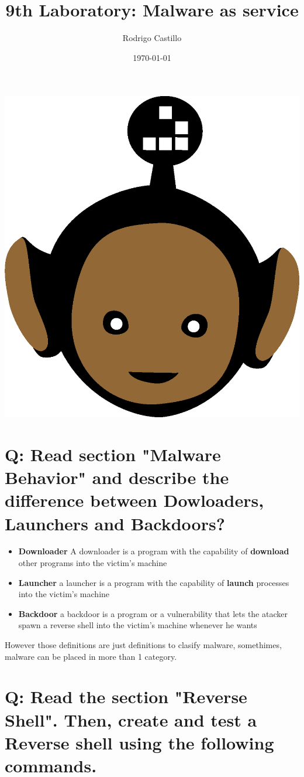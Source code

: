 \documentclass[10pt,a4paper]{article} %
\begin{document}
    \title{{  9th Laboratory: Malware as service  }}
    \author{{Rodrigo Castillo}}
    \date{\today}

    \maketitle


    \includegraphics[width=0.1\linewidth]{negro_cara.png}

    \section{Q: Read section "Malware Behavior" and describe the difference
    between Dowloaders, Launchers and Backdoors?}
        \begin{itemize}
            \item {\textbf{Downloader}  A downloader is a program with the
                capability of \textbf{download} other programs into the
                victim's machine}
            \item {\textbf{Launcher}  a launcher is a program with the
                capability of \textbf{launch} processes into the victim's
            machine}
            \item {\textbf{Backdoor}  a backdoor is a program or a
                vulnerability that lets the atacker spawn a reverse shell into
                the victim's machine whenever he wants}
        \end{itemize}

        However those definitions are just definitions to clasify malware,
        somethimes, malware can be placed in more than 1 category.


    \newpage
    \section{Q: Read the section "Reverse Shell". Then, create and test a
    Reverse shell using the following commands.}
\end{document}
